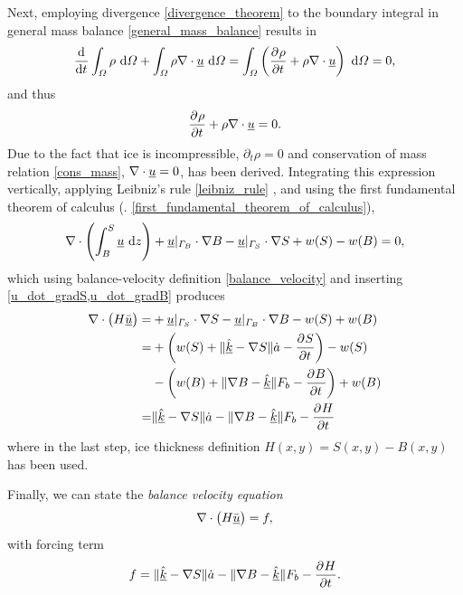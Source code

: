 Next, employing  divergence \cref{divergence_theorem} to the boundary integral in general mass balance \cref{general_mass_balance} results in
\begin{align*}
  \frac{\mathrm{d}{^{}} }{\mathrm{d} t{^{}} } \int_{\varOmega} \rho \ \mathrm{d}\varOmega + \int_{\varOmega} \rho \nabla \cdot \underline{u} \ \mathrm{d}\varOmega = \int_{\varOmega} \left( \frac{\partial{^{}} \rho}{\partial t{^{}} } + \rho \nabla \cdot \underline{u} \right) \ \mathrm{d}\varOmega = 0,
\end{align*}
and thus
\begin{align*}
  \frac{\partial{^{}} \rho}{\partial t{^{}} } + \rho \nabla \cdot \underline{u} = 0.
\end{align*}
Due to the fact that ice is incompressible, $\partial_t \rho = 0$ and conservation of mass relation \cref{cons_mass}, $\nabla \cdot \underline{u} = 0$, has been derived.
Integrating this expression vertically, applying  Leibniz's rule \cref{leibniz_rule} , and using the first fundamental theorem of calculus (\cf. \cref{first_fundamental_theorem_of_calculus}),
\begin{align}
  \label{integrated_cons_mass}
  \nabla \cdot \left( \int_B^S \underline{u} \ \mathrm{d}z \right) + \underline{u} |_{\varGamma_B} \cdot \nabla B - \underline{u} |_{\varGamma_S} \cdot \nabla S + w(S) - w(B) = 0,
\end{align}
which using balance-velocity definition \cref{balance_velocity} and inserting \cref{u_dot_gradS,u_dot_gradB} produces
\begin{align*}
  \nabla \cdot \big( H \bar{\underline{u}} \big) = &+ \underline{u} |_{\varGamma_S} \cdot \nabla S - \underline{u} |_{\varGamma_B} \cdot \nabla B - w(S) + w(B) \\
  =&+ \left( w(S) + \Vert \hat{\underline{k}} - \nabla S \Vert \dot{a} - \frac{\partial{^{}} S}{\partial t{^{}} }\right) - w(S) \\
  &- \left( w(B) + \Vert \nabla B - \hat{\underline{k}} \Vert F_b - \frac{\partial{^{}} B}{\partial t{^{}} } \right) + w(B) \\
  =& \Vert \hat{\underline{k}} - \nabla S \Vert \dot{a} - \Vert \nabla B - \hat{\underline{k}} \Vert F_b - \frac{\partial{^{}} H}{\partial t{^{}} }
\end{align*}
where in the last step, ice thickness definition $H(x,y) = S(x,y) - B(x,y)$ has been used.

Finally, we can state the \emph{balance velocity equation}
\begin{align}
  \label{balance_velocity_equation_one}
  \nabla \cdot \big( H \bar{\underline{u}} \big) = f,
\end{align}
with forcing term
\begin{align}
  \label{balance_velocity_equation_f}
  f = \Vert \hat{\underline{k}} - \nabla S \Vert \dot{a} - \Vert \nabla B - \hat{\underline{k}} \Vert F_b - \frac{\partial{^{}} H}{\partial t{^{}} }.
\end{align}

